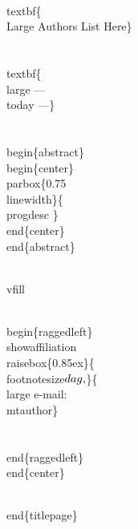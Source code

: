\documentclass[11pt]{article}
\def\nwendcode{\endtrivlist \endgroup} %
\let\nwdocspar=\par                    %
\begin{document}
\\textbf\{\\Large Authors List Here\}\\\\[5ex] 

\\textbf\{\\large --- \\today ---\}\\\\[10ex]

\\begin\{abstract\}
\\begin\{center\}
\\parbox\{0.75\\linewidth\}\{
\\progdesc
\} %
\\end\{center\}
\\end\{abstract\}

\\vfill

\\begin\{raggedleft\}
\\showaffiliation
\\raisebox\{0.85ex\}\{\\footnotesize$\\dag\\,$\}\{\\large e-mail: \\mtauthor\}\\\\
\\end\{raggedleft\}
\\end\{center\}

\\end\{titlepage\} %

\nwendcode{}\nwdocspar

\nwenddocs{}\endmoddef
\end{document}
